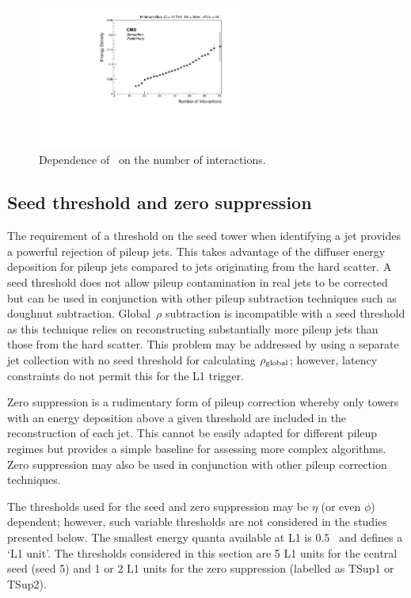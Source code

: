 \begin{figure}
\centering
    \includegraphics[width=0.6\textwidth]{./Figures/triggerUpgrade/threestrips}
  \caption{Dependence of \rhoC~on the number of interactions.}
  \label{fig:threestripNint}
\end{figure}  

\subsection{Seed threshold and zero suppression}
\label{sec:seed_thresh}

The requirement of a threshold on the seed tower when identifying a jet
provides a powerful rejection of pileup jets. This takes advantage of the
diffuser energy deposition for pileup jets compared to jets originating from 
the hard scatter. A seed threshold does not allow pileup contamination in real jets to be corrected
but can be used in conjunction with other pileup subtraction techniques such as doughnut
subtraction. Global~$\rho$ subtraction is incompatible with a seed threshold as this technique relies
on reconstructing substantially more pileup jets than those from the hard scatter. 
This problem may be addressed by using a separate jet collection with no seed threshold
for calculating $\rho_{\text{global}}$; however, latency constraints do not permit this for the L1 trigger.

Zero suppression is a rudimentary form of pileup correction whereby only towers with
an energy deposition above a given threshold are included in the reconstruction of each jet.
This cannot be easily adapted for different pileup regimes but provides a simple baseline 
for assessing more complex algorithms. Zero suppression may also be used in conjunction
with other pileup correction techniques. 

The thresholds used for the seed and zero suppression may be $\eta$ (or even $\phi$) dependent; however,
such variable thresholds are not considered in the studies presented below. The smallest energy quanta
available at L1 is 0.5 \GeV~and defines a `L1 unit'. The thresholds considered in this section are 5 L1 units
for the central seed (seed 5) and 1 or 2 L1 units for the zero suppression (labelled as TSup1 or TSup2).

